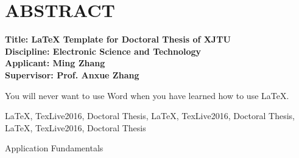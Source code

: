 \chapter*{ABSTRACT}

\vskip-53mm%
{\bfseries
	\noindent Title: \LaTeX{} Template for Doctoral Thesis of XJTU \\
	\noindent Discipline: Electronic Science and Technology \\
	\noindent Applicant: Ming Zhang \\
	\noindent Supervisor: Prof. Anxue Zhang
}
\vskip22mm

\noindent You will never want to use Word when you have learned how to use \LaTeX.

\vspace{\baselineskip}
\hangindent=82pt
 \LaTeX, TexLive2016, Doctoral Thesis, \LaTeX, TexLive2016, Doctoral Thesis, \LaTeX, TexLive2016, Doctoral Thesis

\vspace{\baselineskip}
 Application Fundamentals

\titlespacing{\chapter}{0pt}{-5.3mm}{4.2mm}
\clearpage
